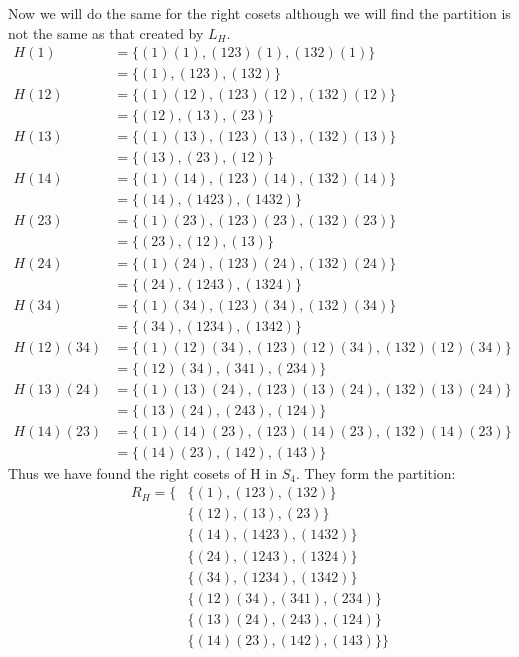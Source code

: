 \documentclass[a4paper, 11pt]{article}
\begin{document}
Now we will do the same for the right cosets although we will find the partition is not the same as that created by $L_H$. 
	\begin{align*}
		H(1)		&= \{(1)(1), (123)(1), (132)(1)\} \\ 	
					&= \{(1), (123), (132)\} \\ 
		H(12)		&= \{(1)(12), (123)(12), (132)(12)\} \\ 
					&= \{(12), (13), (23)\} \\ 
		H(13) 		&= \{(1)(13), (123)(13), (132)(13)\} \\ 
					&= \{(13), (23), (12)\} \\ 
		H(14) 		&= \{(1)(14), (123)(14), (132)(14)\} \\ 
					&= \{(14), (1423), (1432)\} \\ 
		H(23) 		&= \{(1)(23), (123)(23), (132)(23)\} \\ 
					&= \{(23), (12), (13)\} \\ 
		H(24) 		&= \{(1)(24), (123)(24), (132)(24)\} \\ 
					&= \{(24), (1243), (1324)\} \\ 
		H(34) 		&= \{(1)(34), (123)(34), (132)(34)\} \\ 
					&= \{(34), (1234), (1342)\} \\ 
		H(12)(34) 	&= \{(1)(12)(34), (123)(12)(34), (132)(12)(34)\} \\ 
					&= \{(12)(34), (341), (234)\} \\ 
		H(13)(24) 	&= \{(1)(13)(24), (123)(13)(24), (132)(13)(24)\} \\ 
					&= \{(13)(24), (243), (124)\} \\ 
		H(14)(23) 	&= \{(1)(14)(23), (123)(14)(23), (132)(14)(23)\} \\ 
					&= \{(14)(23), (142), (143)\} 
 	\end{align*}
Thus we have found the right cosets of H in $S_4$. They form the partition: 
	\begin{align*}
		R_H = \{& \{(1), (123), (132)\} \\
				& \{(12), (13), (23)\} \\
				& \{(14), (1423), (1432)\} \\ 
				& \{(24), (1243), (1324)\} \\ 
				& \{(34), (1234), (1342)\} \\
				& \{(12)(34), (341), (234)\} \\ 
				& \{(13)(24), (243), (124)\} \\ 
				& \{(14)(23), (142), (143)\} \}
	\end{align*}
\end{document}
